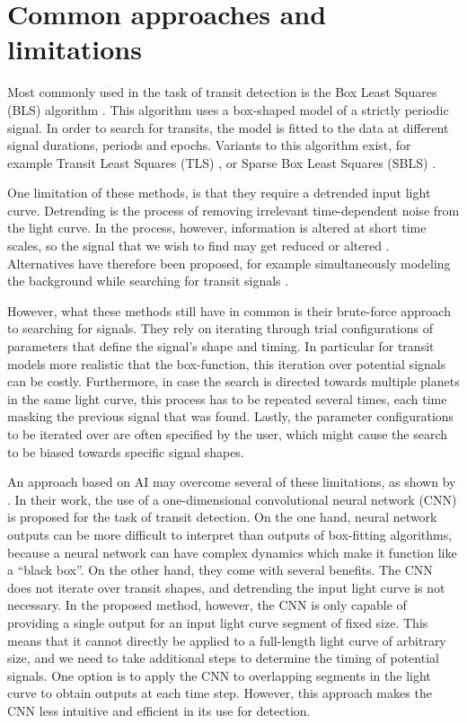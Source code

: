 
\section{Common approaches and limitations}
\label{sec:approaches}

Most commonly used in the task of transit detection is the Box Least Squares (BLS) algorithm \citep{kovacs2002box}. This algorithm uses a box-shaped model of a strictly periodic signal. In order to search for transits, the model is fitted to the data at different signal durations, periods and epochs. Variants to this algorithm exist, for example Transit Least Squares (TLS) \citep{hippke2019optimized}, or Sparse Box Least Squares (SBLS) \citep{panahi2021sparse}.

One limitation of these methods, is that they require a detrended input light curve. Detrending is the process of removing irrelevant time-dependent noise from the light curve. In the process, however, information is altered at short time scales, so the signal that we wish to find may get reduced or altered \citep{hippke2019wotan}.  Alternatives have therefore been proposed, for example simultaneously modeling the background while searching for transit signals \cite{foreman2015systematic}.

However, what these methods still have in common is their brute-force approach to searching for signals. They rely on iterating through trial configurations of parameters that define the signal's shape and timing. In particular for transit models more realistic that the box-function, this iteration over potential signals can be costly. Furthermore, in case the search is directed towards multiple planets in the same light curve, this process has to be repeated several times, each time masking the previous signal that was found. Lastly, the parameter configurations to be iterated over are often specified by the user, which might cause the search to be biased towards specific signal shapes.

An approach based on AI may overcome several of these limitations, as shown by \cite{pearson2018searching}. In their work, the use of a one-dimensional convolutional neural network (CNN) is proposed for the task of transit detection. On the one hand, neural network outputs can be more difficult to interpret than outputs of box-fitting algorithms, because a neural network can have complex dynamics which make it function like a ``black box''. On the other hand, they come with several benefits. The CNN does not iterate over transit shapes, and detrending the input light curve is not necessary. In the proposed method, however, the CNN is only capable of providing a single output for an input light curve segment of fixed size. This means that it cannot directly be applied to a full-length light curve of arbitrary size, and we need to take additional steps to determine the timing of potential signals. One option is to apply the CNN to overlapping segments in the light curve to obtain outputs at each time step. However, this approach makes the CNN less intuitive and efficient in its use for detection. 


